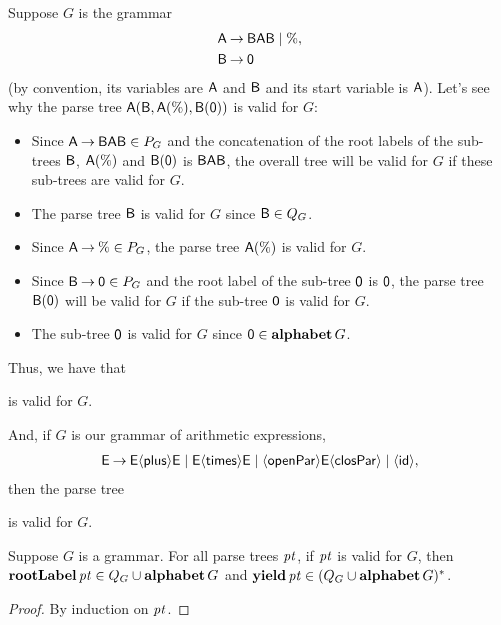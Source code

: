 Suppose $G$ is the grammar
\begin{align*}
\mathsf{A} &\mathbin{\to} \mathsf{B}\mathsf{A}\mathsf{B} \mid \% , \\
\mathsf{B} &\mathbin{\to} \mathsf{0} 
\end{align*}
(by convention, its variables are $\mathsf{A}$ and $\mathsf{B}$ and its
start variable is $\mathsf{A}$).
Let's see why the parse tree $\mathsf{A}(\mathsf{B},\mathsf{A}(\%),\mathsf{B}(\mathsf{0}))$ is
valid for $G$:
\begin{itemize}
\item Since $\mathsf{A}\mathbin{\to}\mathsf{B}\mathsf{A}\mathsf{B}\in P_G$ and the concatenation
of the root labels of the sub-trees
$\mathsf{B}$, $\mathsf{A}(\%)$ and $\mathsf{B}(\mathsf{0})$ is $\mathsf{B}\mathsf{A}\mathsf{B}$,
the overall tree will be valid for $G$ if these sub-trees are valid
for $G$.

\item The parse tree $\mathsf{B}$ is valid for $G$
since $\mathsf{B}\in Q_G$.

\item Since $\mathsf{A}\mathbin{\to}\%\in P_G$, the parse tree
$\mathsf{A}(\%)$ is valid for $G$.

\item Since $\mathsf{B}\mathbin{\to}\mathsf{0}\in P_G$ and the root label of the sub-tree
$\mathsf{0}$ is $\mathsf{0}$, the parse tree
$\mathsf{B}(\mathsf{0})$ will be valid for $G$ if the sub-tree $\mathsf{0}$
is valid for $G$.

\item The sub-tree $\mathsf{0}$ is valid for $G$ since
  $\mathsf{0}\in\mathbf{alphabet}\,G$.
\end{itemize}
Thus, we have that
\begin{center}

\end{center}
is valid for $G$.

And, if $G$ is our grammar of arithmetic expressions,
\begin{gather*}
\mathsf{E\mathbin{\to} E{\langle\mathsf{plus}\rangle} E\mid E{\langle\mathsf{times}\rangle} E\mid {\langle\mathsf{openPar}\rangle} E{\langle\mathsf{closPar}\rangle} \mid
{\langle\mathsf{id}\rangle}} ,
\end{gather*}
then the parse tree
\begin{center}

\end{center}
is valid for $G$.

\begin{proposition}
Suppose $G$ is a grammar. For all parse trees ${\it pt}$, if ${\it pt}$ is valid
for $G$, then $\mathbf{rootLabel}\,{\it pt}\in Q_G\cup\mathbf{alphabet}\,G$ and
$\mathbf{yield}\,{\it pt} \in (Q_G\cup\mathbf{alphabet}\,G)^*$.
\end{proposition}

\begin{proof}
By induction on ${\it pt}$.
\end{proof}

